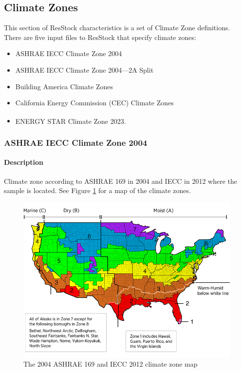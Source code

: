 \subsection{Climate Zones}
This section of ResStock characteristics is a set of Climate Zone definitions. There are five input files to ResStock that specify climate zones:
\begin{itemize}
    \item ASHRAE IECC Climate Zone 2004
    \item ASHRAE IECC Climate Zone 2004---2A Split
    \item Building America Climate Zones
    \item California Energy Commission (CEC) Climate Zones
    \item ENERGY STAR\textsuperscript{\textregistered} Climate Zone 2023.
\end{itemize}
\subsubsection{ASHRAE IECC Climate Zone 2004} \label{sec:ashrae_2004_tsv}
\paragraph{Description}
Climate zone according to ASHRAE 169 in 2004 and IECC in 2012 where the sample is located. See Figure \ref{fig:ashrae_169_2004_cz} for a map of the climate zones.

\begin{figure}
    \centering
    \includegraphics[width=1\linewidth]{images/ashrae_iecc_cz_map_2004.jpg}
    \caption{The 2004 ASHRAE 169 and IECC 2012 climate zone map}
    \label{fig:ashrae_169_2004_cz}
\end{figure}

